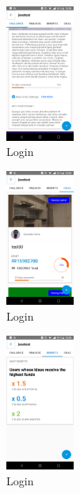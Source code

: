 \begin{figure}[!h]
	\begin{center}
		\includegraphics[width=0.2\textwidth]{./img/anexo1/ver_desafio_inicio_cont.png}
		\caption{Login}
		\label{fig:ver_desafio_inicio_cont}
	\end{center}
\end{figure}

\begin{figure}[!h]
	\begin{center}
		\includegraphics[width=0.2\textwidth]{./img/anexo1/ver_desafio_ideas.png}
		\caption{Login}
		\label{fig:ver_desafio_inicio_ideas}
	\end{center}
\end{figure}

\begin{figure}[!h]
	\begin{center}
		\includegraphics[width=0.2\textwidth]{./img/anexo1/ver_desafio_beneficios.png}
		\caption{Login}
		\label{fig:ver_desafio_inicio_beneficios}
	\end{center}
\end{figure}


